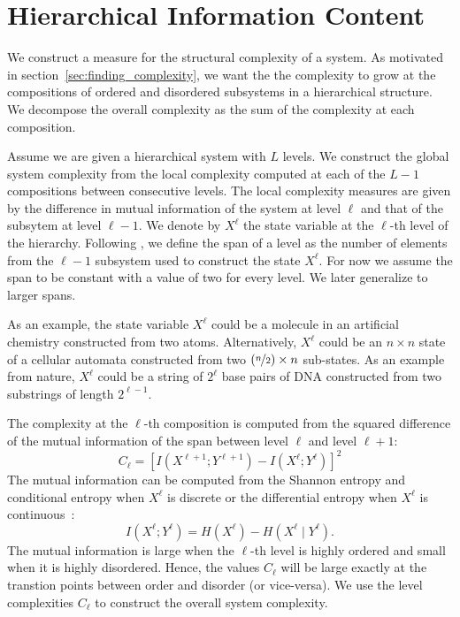 \section{Hierarchical Information Content}
\label{sec:hic}

We construct a measure for the structural complexity of a system. As motivated
in section~\ref{sec:finding_complexity}, we want the the complexity to grow at
the compositions of ordered and disordered subsystems in a hierarchical
structure. We decompose the overall complexity as the sum of the complexity at
each composition.

Assume we are given a hierarchical system with $L$ levels. We construct the
global system complexity from the local complexity computed at each of the
$L-1$ compositions between consecutive levels. The local complexity measures
are given by the difference in mutual information of the system at level
$\ell$ and that of the subsytem at level $\ell - 1$. We denote by $X^{\ell}$ the
state variable at the $\ell$-th level of the hierarchy. Following
\citet{simon1991architecture}, we define the span of a level as the
number of elements from the $\ell - 1$ subsystem used to construct the state
$X^\ell$. For now we assume the span to be constant with a value of two for
every level. We later generalize to larger spans.

As an example, the state variable $X^\ell$ could be a molecule in an artificial
chemistry constructed from two atoms. Alternatively, $X^{\ell}$ could be an $n
\times n$ state of a cellular automata constructed from two $(\nicefrac{n}{2})
\times n$ sub-states. As an example from nature, $X^{\ell}$ could be a string
of $2^\ell$ base pairs of DNA constructed from two substrings of length $2^{\ell
- 1}$.

The complexity at the $\ell$-th composition is computed from the squared
difference of the mutual information of the span between level $\ell$ and level
$\ell + 1$:
\begin{equation}
    C_\ell = \left[ I(X^{\ell + 1}; Y^{\ell + 1}) - I(X^{\ell}; Y^{\ell}) \right]^2
\end{equation}
The mutual information can be computed from the Shannon entropy and conditional
entropy when $X^\ell$ is discrete or the differential entropy when $X^\ell$ is
continuous~\citep{cover1999elements}:
\begin{equation}
\label{eq:mutual_information}
I(X^\ell; Y^\ell) = H(X^\ell) - H(X^\ell \mid Y^\ell).
\end{equation}
The mutual information is large when the $\ell$-th level is highly ordered and
small when it is highly disordered. Hence, the values $C_\ell$ will be large
exactly at the transtion points between order and disorder (or vice-versa).  We
use the level complexities $C_\ell$ to construct the overall system complexity.

